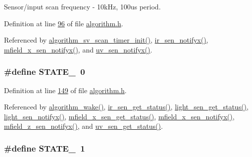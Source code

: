 Sensor/input scan frequency -\/ 10k\+Hz, 100us period. 



Definition at line \hyperlink{a00021_source_l00096}{96} of file \hyperlink{a00021_source}{algorithm.\+h}.



Referenced by \hyperlink{a00038_source_l00543}{algorithm\+\_\+sv\+\_\+scan\+\_\+timer\+\_\+init()}, \hyperlink{a00045_source_l00141}{ir\+\_\+sen\+\_\+notifyx()}, \hyperlink{a00050_source_l00107}{mfield\+\_\+x\+\_\+sen\+\_\+notifyx()}, and \hyperlink{a00073_source_l00141}{uv\+\_\+sen\+\_\+notifyx()}.

\hypertarget{a00021_ad6739dbbe5581cac99b7dc8a5e09949c}{
\subsubsection[{S\+T\+A\+T\+E\+\_\+0}]{\setlength{\rightskip}{0pt plus 5cm}\#define S\+T\+A\+T\+E\+\_~0}}\label{a00021_ad6739dbbe5581cac99b7dc8a5e09949c}


Definition at line \hyperlink{a00021_source_l00149}{149} of file \hyperlink{a00021_source}{algorithm.\+h}.



Referenced by \hyperlink{a00038_source_l00670}{algorithm\+\_\+wake()}, \hyperlink{a00045_source_l00302}{ir\+\_\+sen\+\_\+get\+\_\+status()}, \hyperlink{a00047_source_l00204}{light\+\_\+sen\+\_\+get\+\_\+status()}, \hyperlink{a00047_source_l00106}{light\+\_\+sen\+\_\+notifyx()}, \hyperlink{a00050_source_l00276}{mfield\+\_\+x\+\_\+sen\+\_\+get\+\_\+status()}, \hyperlink{a00052_source_l00138}{mfield\+\_\+x\+\_\+sen\+\_\+notifyx()}, \hyperlink{a00053_source_l00114}{mfield\+\_\+z\+\_\+sen\+\_\+notifyx()}, and \hyperlink{a00073_source_l00302}{uv\+\_\+sen\+\_\+get\+\_\+status()}.

\hypertarget{a00021_a727351838367f27ac0adb9a13422c342}{
\subsubsection[{S\+T\+A\+T\+E\+\_\+1}]{\setlength{\rightskip}{0pt plus 5cm}\#define S\+T\+A\+T\+E\+\_~1}}\label{a00021_a727351838367f27ac0adb9a13422c342}


